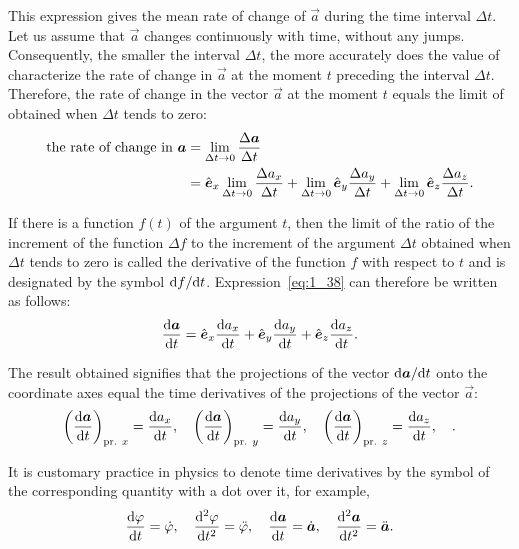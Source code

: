 \noindent
This expression gives the mean rate of change of $\vec{a}$ during the time interval $\Delta t$. Let us assume that $\vec{a}$ changes continuously with time, without any jumps. Consequently, the smaller the interval $\Delta t$, the more accurately does the value of  characterize the rate of change in $\vec{a}$ at the moment $t$ preceding the interval $\Delta t$. Therefore, the rate of change in the vector $\vec{a}$ at the moment $t$ equals the limit of  obtained when $\Delta t$ tends to zero:
\begin{align}
\text{the rate of change in }\boldsymbol{a} &= \lim_{\Delta t\to 0}\frac{\Delta\boldsymbol{a}}{\Delta t} \nonumber\\
&= \hat{\boldsymbol{e}}_{x} \lim_{\Delta t\to 0}\frac{\Delta a_x}{\Delta t} + \lim_{\Delta t\to 0}\hat{\boldsymbol{e}}_{y} \frac{\Delta a_y}{\Delta t} + \lim_{\Delta t\to 0}\hat{\boldsymbol{e}}_{z} \frac{\Delta a_z}{\Delta t}.\label{eq:1_38}
\end{align}

If there is a function $f(t)$ of the argument $t$, then the limit of the ratio of the increment of the function $\Delta f$ to the increment of the argument $\Delta t$ obtained when $\Delta t$ tends to zero is called the derivative of the function $f$ with respect to $t$ and is designated by the symbol $\mathrm{d} f/\mathrm{d} t$. Expression~\eqref{eq:1_38} can therefore be written as follows:
\begin{equation}\label{eq:1_39}
\frac{\mathrm{d}\boldsymbol{a}}{\mathrm{d} t} = \hat{\boldsymbol{e}}_{x}\frac{\mathrm{d} a_x}{\mathrm{d} t} + \hat{\boldsymbol{e}}_{y}\frac{\mathrm{d} a_y}{\mathrm{d} t} + \hat{\boldsymbol{e}}_{z}\frac{\mathrm{d} a_z}{\mathrm{d} t}.
\end{equation}

\noindent
The result obtained signifies that the projections of the vector $\mathrm{d}\boldsymbol{a}/\mathrm{d} t$ onto the coordinate axes equal the time derivatives of the projections of the vector $\vec{a}$:
\begin{equation}\label{eq:1_40}
\left(\frac{\mathrm{d}\boldsymbol{a}}{\mathrm{d} t}\right)_{\text{pr. }x} = \frac{\mathrm{d} a_x}{\mathrm{d} t},\quad \left(\frac{\mathrm{d}\boldsymbol{a}}{\mathrm{d} t}\right)_{\text{pr. }y} = \frac{\mathrm{d} a_y}{\mathrm{d} t},\quad \left(\frac{\mathrm{d}\boldsymbol{a}}{\mathrm{d} t}\right)_{\text{pr. }z} = \frac{\mathrm{d} a_z}{\mathrm{d} t},\quad.
\end{equation}

It is customary practice in physics to denote time derivatives by the symbol of the corresponding quantity with a dot over it, for example,
\begin{equation}\label{eq:1_41}
\frac{\mathrm{d}\varphi}{\mathrm{d} t} = \dot{\varphi},\quad \frac{\mathrm{d}^2\varphi}{\mathrm{d} t^2} = \ddot{\varphi},\quad \frac{\mathrm{d}\boldsymbol{a}}{\mathrm{d} t} = \dot{\boldsymbol{a}},\quad \frac{\mathrm{d}^2\boldsymbol{a}}{\mathrm{d} t^2} = \ddot{\boldsymbol{a}}.
\end{equation}

